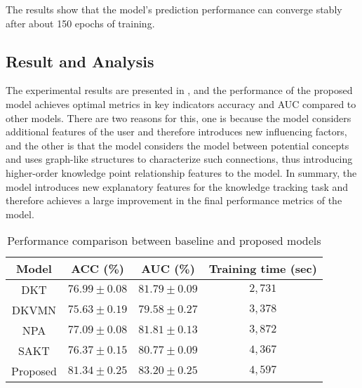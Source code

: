 The results show that the model's prediction performance can converge stably after about 150 epochs of training.
\subsection{Result and Analysis}
The experimental results are presented in \tblname{\ref{tbl:ch3-performance}}, and the performance of the proposed model achieves optimal metrics in key indicators accuracy and AUC compared to other models. There are two reasons for this, one is because the model considers additional features of the user and therefore introduces new influencing factors, and the other is that the model considers the model between potential concepts and uses graph-like structures to characterize such connections, thus introducing higher-order knowledge point relationship features to the model. In summary, the model introduces new explanatory features for the knowledge tracking task and therefore achieves a large improvement in the final performance metrics of the model.

\begin{table}[htb]
    \centering
    \caption{Performance comparison between baseline and proposed models}\label{tbl:ch3-performance}
    \begin{tabular}{cccc}
        \toprule
        Model    & ACC (\%)                    & AUC (\%)                   & Training time (sec) \\
        \midrule
        DKT      & \(76.99\pm 0.08 \)          & \(81.79\pm 0.09\)          & \(2,731\)           \\
        DKVMN    & \(75.63\pm 0.19 \)          & \(79.58\pm 0.27\)          & \(3,378\)           \\
        NPA      & \(77.09\pm 0.08\)           & \(81.81\pm 0.13\)          & \(3,872\)           \\
        SAKT     & \(76.37\pm 0.15\)           & \(80.77\pm 0.09\)          & \(4,367\)           \\
        \midrule
        Proposed & \(\mathbf{81.34\pm 0.25} \) & \(\mathbf{83.20\pm 0.25}\) & \(4,597\)           \\
        \bottomrule
    \end{tabular}
\end{table}

